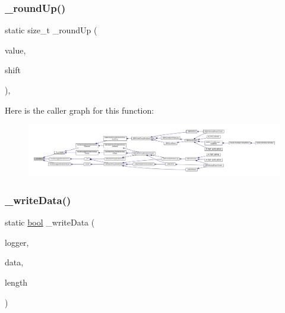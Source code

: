 \subsubsection{\texorpdfstring{\+\_\+round\+Up()}{\_roundUp()}}
{\footnotesize\ttfamily static size\+\_\+t \+\_\+round\+Up (\begin{DoxyParamCaption}\item[{size\+\_\+t}]{value,  }\item[{\mbox{\hyperlink{ioapi_8h_a787fa3cf048117ba7123753c1e74fcd6}{int}}}]{shift }\end{DoxyParamCaption})\hspace{0.3cm}{\ttfamily [inline]}, {\ttfamily [static]}}

Here is the caller graph for this function\+:
\nopagebreak
\begin{figure}[H]
\begin{center}
\leavevmode
\includegraphics[width=350pt]{video-logger_8c_a18aadf02a7a40b898d4b6d362af0e06a_icgraph}
\end{center}
\end{figure}
\mbox{\label{video-logger_8c_a163afd173e5992530065bb8ddc2b693e}} 
\subsubsection{\texorpdfstring{\+\_\+write\+Data()}{\_writeData()}}
{\footnotesize\ttfamily static \mbox{\hyperlink{libretro_8h_a4a26dcae73fb7e1528214a068aca317e}{bool}} \+\_\+write\+Data (\begin{DoxyParamCaption}\item[{struct m\+Video\+Logger $\ast$}]{logger,  }\item[{const void $\ast$}]{data,  }\item[{size\+\_\+t}]{length }\end{DoxyParamCaption})\hspace{0.3cm}{\ttfamily [static]}}

